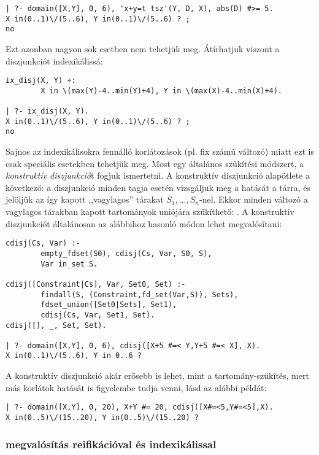 \begin{verbatim}
| ?- domain([X,Y], 0, 6), 'x+y=t tsz'(Y, D, X), abs(D) #>= 5.
X in(0..1)\/(5..6), Y in(0..1)\/(5..6) ? ;
no
\end{verbatim}

Ezt azonban nagyon sok esetben nem tehetjük meg. Átírhatjuk viszont a diszjunkciót
indexikálissá:

\begin{verbatim}
ix_disj(X, Y) +: 
        X in \(max(Y)-4..min(Y)+4), Y in \(max(X)-4..min(X)+4).

| ?- ix_disj(X, Y).
X in(0..1)\/(5..6), Y in(0..1)\/(5..6) ? ;
no
\end{verbatim}

Sajnos az indexikálisokra fennálló korlátozások (pl. fix számú változó) miatt ezt
is csak speciális esetekben tehetjük meg. Most egy általános szűkítési módszert,
a \emph{konstruktív diszjunkció}t fogjuk ismertetni.
\br
A konstruktív diszjunkció alapötlete a következő: a diszjunkció minden tagja esetén
vizsgáljuk meg a hatását a tárra, és jelöljük az így kapott ,,vagylagos'' tárakat
$S_1, \ldots, S_n$-nel. Ekkor minden változó a vagylagos tárakban kapott tartományok
uniójára szűkíthető: . A konstruktív diszjunkciót
általánosan az alábbihoz hasonló módon lehet megvalósítani:

\begin{verbatim}
cdisj(Cs, Var) :-
        empty_fdset(S0), cdisj(Cs, Var, S0, S), 
        Var in_set S.

cdisj([Constraint|Cs], Var, Set0, Set) :-
        findall(S, (Constraint,fd_set(Var,S)), Sets),
        fdset_union([Set0|Sets], Set1),
        cdisj(Cs, Var, Set1, Set).
cdisj([], _, Set, Set).

| ?- domain([X,Y], 0, 6), cdisj([X+5 #=< Y,Y+5 #=< X], X).
X in(0..1)\/(5..6), Y in 0..6 ? 
\end{verbatim}

A konstruktív diszjunkció akár erősebb is lehet, mint a tartomány-szűkítés, mert más
korlátok hatását is figyelembe tudja venni, lásd az alábbi példát:

\begin{verbatim}
| ?- domain([X,Y], 0, 20), X+Y #= 20, cdisj([X#=<5,Y#=<5],X).
X in(0..5)\/(15..20), Y in(0..5)\/(15..20) ? 
\end{verbatim}

\subsubsection{\clpfd megvalósítás reifikációval és indexikálissal}

